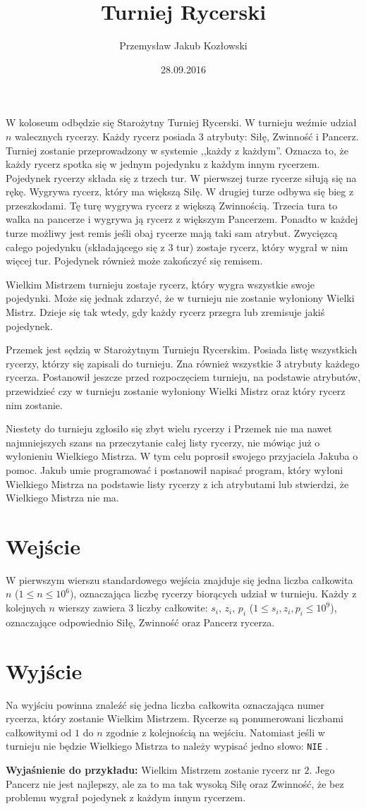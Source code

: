 \documentclass[zad,zawodnik,utf8]{sinol}
\title{Turniej Rycerski}
\author{Przemysław Jakub Kozłowski} %
\date{28.09.2016}
\begin{document}
\begin{tasktext}%
W koloseum odbędzie się Starożytny Turniej Rycerski. W turnieju weźmie udział $n$ walecznych rycerzy. Każdy rycerz posiada 3 atrybuty: Siłę, Zwinność i Pancerz. Turniej zostanie przeprowadzony w systemie ,,każdy z każdym''. Oznacza to, że każdy rycerz spotka się w jednym pojedynku z każdym innym rycerzem. Pojedynek rycerzy składa się z trzech tur. W pierwszej turze rycerze siłują się na rękę. Wygrywa rycerz, który ma większą Siłę. W drugiej turze odbywa się bieg z przeszkodami. Tę turę wygrywa rycerz z większą Zwinnością. Trzecia tura to walka na pancerze i wygrywa ją rycerz z większym Pancerzem. Ponadto w każdej turze możliwy jest remis jeśli obaj rycerze mają taki sam atrybut. Zwycięzcą całego pojedynku (składającego się z 3 tur) zostaje rycerz, który wygrał w nim więcej tur. Pojedynek również może zakończyć się remisem.

Wielkim Mistrzem turnieju zostaje rycerz, który wygra wszystkie swoje pojedynki. Może się jednak zdarzyć, że w turnieju nie zostanie wyłoniony Wielki Mistrz. Dzieje się tak wtedy, gdy każdy rycerz przegra lub zremisuje jakiś pojedynek.

Przemek jest sędzią w Starożytnym Turnieju Rycerskim. Posiada listę wszystkich rycerzy, którzy się zapisali do turnieju. Zna również wszystkie 3 atrybuty każdego rycerza. Postanowił jeszcze przed rozpoczęciem turnieju, na podstawie atrybutów, przewidzieć czy w turnieju zostanie wyłoniony Wielki Mistrz oraz który rycerz nim zostanie.

Niestety do turnieju zgłosiło się zbyt wielu rycerzy i Przemek nie ma nawet najmniejszych szans na przeczytanie całej listy rycerzy, nie mówiąc już o wyłonieniu Wielkiego Mistrza. W tym celu poprosił swojego przyjaciela Jakuba o pomoc. Jakub umie programować i postanowił napisać program, który wyłoni Wielkiego Mistrza na podstawie listy rycerzy z ich atrybutami lub stwierdzi, że Wielkiego Mistrza nie ma.

  \section{Wejście}
W pierwszym wierszu standardowego wejścia znajduje się jedna liczba całkowita $n$ ($1 \leq n \leq 10^6$), oznaczająca liczbę rycerzy biorących udział w turnieju. Każdy z kolejnych $n$ wierszy zawiera 3 liczby całkowite: $s_i$, $z_i$, $p_i$ ($1 \leq s_i, z_i, p_i \leq 10^9$), oznaczające odpowiednio Siłę, Zwinność oraz Pancerz rycerza.

  \section{Wyjście}
Na wyjściu powinna znaleźć się jedna liczba całkowita oznaczająca numer rycerza, który zostanie Wielkim Mistrzem. Rycerze są ponumerowani liczbami całkowitymi od $1$ do $n$ zgodnie z kolejnością na wejściu. Natomiast jeśli w turnieju nie będzie Wielkiego Mistrza to należy wypisać jedno słowo: \texttt{NIE} .

\makecompactexample

\textbf{Wyjaśnienie do przykładu:} Wielkim Mistrzem zostanie rycerz nr $2$. Jego Pancerz nie jest najlepszy, ale za to ma tak wysoką Siłę oraz Zwinność, że bez problemu wygrał pojedynek z każdym innym rycerzem.

\end{tasktext}
\end{document}
